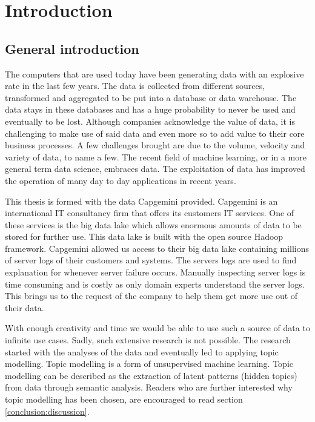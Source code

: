 \chapter{Introduction} \label{ch:introduction}

\section{General introduction}\label{introduction:Generalinformation}
The computers that are used today have been generating data with an explosive rate in the last few years. The data is collected from different sources, transformed and aggregated to be put into a database or data warehouse. The data stays in these databases and has a huge probability to never be used and eventually to be lost. Although companies acknowledge the value of data, it is challenging to make use of said data and even more so to add value to their core business processes. A few challenges brought are due to the volume, velocity and variety of data, to name a few. The recent field of machine learning, or in a more general term data science, embraces data. The exploitation of data has improved the operation of many day to day applications in recent years. 

\setlength{\parindent}{3ex} This thesis is formed with the data Capgemini provided. Capgemini is an international IT consultancy firm that offers its customers IT services. One of these services is the big data lake which allows enormous amounts of data to be stored for further use. This data lake is built with the open source Hadoop framework. Capgemini allowed us access to their big data lake containing millions of server logs of their customers and systems. The servers logs are used to find explanation for whenever server failure occurs. Manually inspecting server logs is time consuming and is costly as only domain experts understand the server logs. This brings us to the request of the company to help them get more use out of their data. 

With enough creativity and time we would be able to use such a source of data to infinite use cases. Sadly, such extensive research is not possible. The research started with the analyses of the data and eventually led to applying topic modelling. Topic modelling is a form of unsupervised machine learning. Topic modelling can be described as the extraction of latent patterns (hidden topics) from data through semantic analysis. Readers who are further interested why topic modelling has been chosen, are encouraged to read section \ref{conclusion:discussion}. 

